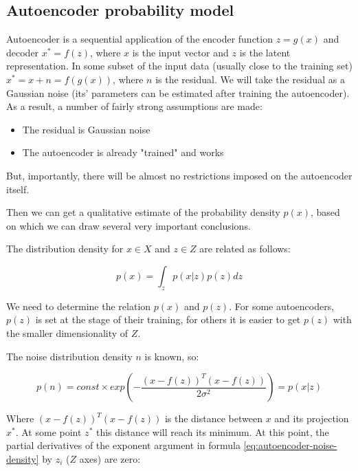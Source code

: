 \subsection{Autoencoder probability model}

Autoencoder is a sequential application of the encoder function $z=g(x)$ and decoder $x^*=f(z)$, where $x$ is the input vector and $z$ is the latent representation. In some subset of the input data (usually close to the training set) $x^*=x+n=f(g(x))$, where $n$ is the residual. We will take the residual as a Gaussian noise (its' parameters can be estimated after training the autoencoder). As a result, a number of fairly strong assumptions are made:

\begin{itemize}
    \item The residual is Gaussian noise
    \item The autoencoder is already "trained" and works
\end{itemize}

But, importantly, there will be almost no restrictions imposed on the autoencoder itself.

Then we can get a qualitative estimate of the probability density $p(x)$, based on which we can draw several very important conclusions.

The distribution density for $x\in X$ and $z\in Z$ are related as follows:

\begin{equation}
    \label{eq:autoencoder-density}
    p(x) = \int_{z} p(x|z)p(z)dz
\end{equation}

We need to determine the relation $p(x)$ and $p(z)$. For some autoencoders, $p(z)$ is set at the stage of their training, for others it is easier to get $p(z)$ with the smaller dimensionality of $Z$.

The noise distribution density $n$ is known, so:

\begin{equation}
    \label{eq:autoencoder-noise-density}
    p(n)=const\times exp( -\frac{(x-f(z))^T (x-f(z))}{2\sigma^2} )=p(x|z)
\end{equation}

Where $(x-f(z))^T (x-f(z))$ is the distance between $x$ and its projection $x^*$. At some point $z^*$ this distance will reach its minimum. At this point, the partial derivatives of the exponent argument in formula \ref{eq:autoencoder-noise-density} by $z_i$ ($Z$ axes) are zero:

